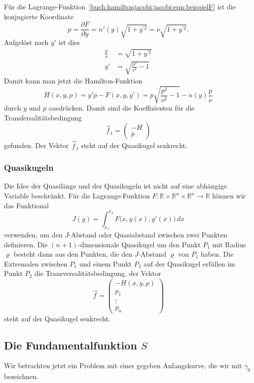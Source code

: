 \begin{beispiel}
\label{buch:hamiltonjacobi:jacobi:bsp:beispielFH}
Für die Lagrange-Funktion~\eqref{buch:hamiltonjacobi:jacobi:eqn:beispielF}
ist die konjugierte Koordinate
\[
p
=
\frac{\partial F}{\partial y}
=
n'(y)\sqrt{1+y^{\prime 2}}
=
\nu \sqrt{1+y^{\prime 2}}.
\]
Aufgelöst nach $y'$ ist dies
\begin{align*}
\frac{p}{\nu}
&=
\sqrt{1+y^{\prime 2}}
\\
y'
&=
\sqrt{ \frac{p^2}{\nu^2} -1 }
\end{align*}
Damit kann man jetzt die Hamilton-Funktion
\[
H(x,y,p)
=
y'p - F(x,y,y')
=
p\sqrt{\frac{p^2}{\nu^2}-1}
-
n(y) \frac{p}{\nu}
\]
durch $y$ und $p$ ausdrücken.
Damit sind die Koeffizienten für die Transfersalitätsbedingung
\[
\vec{f}_1
=
\begin{pmatrix} 
-H\\
p
\end{pmatrix}
\]
gefunden.
Der Vektor $\vec{f}_1$ steht auf der Quasikugel senkrecht.
\end{beispiel}

%
%
\subsubsection{Quasikugeln}
Die Idee der Quasilänge und der Quasikugeln ist nicht auf eine abhängige
Variable beschränkt.
Für die Lagrange-Funktion 
$F\colon \mathbb{R}\times\mathbb{R}^n\times\mathbb{R}^n\to\mathbb{R}$
können wir das Funktional
\[
J(y) = \int_{x_1}^{x_2} F\bigl(x,y(x),y'(x)\bigr)\,dx
\]
verwenden, um den $J$-Abstand oder Quasiabstand zwischen zwei Punkten
definieren.
Die $(n+1)$-dimensionale Quasikugel um den Punkt $P_1$ mit Radius $\varrho$
besteht dann aus den Punkten, die den $J$-Abstand $\varrho$ von $P_1$ haben.
Die Extremalen zwischen $P_1$ und einem Punkt $P_2$ auf der Quasikugel
erfüllen im Punkt $P_2$ die Transversalitätsbedingung, der Vektor
\[
\vec{f}
=
\begin{pmatrix}
-H(x,y,p)\\
p_1\\
\vdots\\
p_n
\end{pmatrix}
\]
steht auf der Quasikugel senkrecht.

%
%
\subsection{Die Fundamentalfunktion $S$}
Wir betrachten jetzt ein Problem mit einer gegeben Anfangskurve,
die wir mit $\gamma_0$ bezeichnen.

